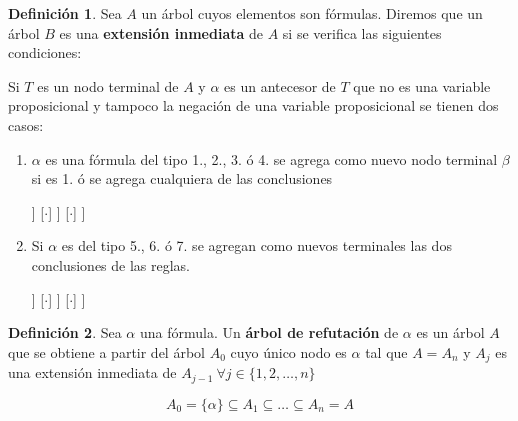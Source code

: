 \documentclass[a4paper,11pt]{article}
\theoremstyle{definition}
\newtheorem{defn}{Definición}[section]
\theoremstyle{remark}
\begin{document}
\begin{defn}
	Sea $A$ un árbol cuyos elementos son fórmulas. Diremos que un árbol $B$ es una \textbf{extensión inmediata} 
	de $A$ si se verifica las siguientes condiciones:
	
	Si $T$ es un nodo terminal de $A$ y $\alpha$ es un antecesor de $T$ que no es una variable proposicional
	y tampoco la negación de una variable proposicional se tienen dos casos:
	
	\begin{enumerate}
		\item $\alpha$ es una fórmula del tipo 1., 2., 3. ó 4. se agrega como nuevo nodo terminal $\beta$
		si es 1. ó se agrega cualquiera de las conclusiones
		
		\begin{forest}
			[$\alpha$
				[$\cdot$]
				[$\alpha$ 
					[$\alpha$
						[$\beta$,edge=dotted]
					]
					[$\cdot$]
				]
				[$\cdot$]
			]
		\end{forest}
		
		\item Si $\alpha$ es del tipo 5., 6. ó 7. se agregan como nuevos terminales las dos conclusiones
		de las reglas.
		
		\begin{forest}
			[$\cdot$
				[$\cdot$]
				[$\cdot$ 
					[$\cdot$
						[$\alpha_1$,edge=dotted]
						[$\alpha_2$,edge=dotted]
					]
					[$\cdot$]
				]
				[$\cdot$]
			]
		\end{forest}
	\end{enumerate}
\end{defn}

\begin{defn}
	Sea $\alpha$ una fórmula. Un \textbf{árbol de refutación} de $\alpha$ es un árbol $A$ que se obtiene a partir
	del árbol $A_0$ cuyo único nodo es $\alpha$ tal que $A = A_n$ y $A_j$ es una extensión inmediata de 
	$A_{j-1}\ \forall j \in \{1, 2, \dots, n\}$
	
	\[
		A_0 = \{\alpha\} \subseteq A_1 \subseteq \dots \subseteq A_n = A
	\]
\end{defn}
\end{document}
